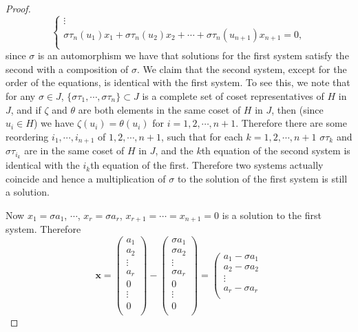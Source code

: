\begin{proof}
$$\begin{cases}
	\vdots\\
	\sigma \tau _n\left( u_1 \right) x_1+\sigma \tau _n\left( u_2 \right) x_2+\cdots +\sigma \tau _n\left( u_{n+1} \right) x_{n+1}=0,\\
\end{cases}
$$
since $\sigma$ is an automorphism we have that solutions for the first system satisfy the second with a composition of $\sigma$. We claim that the second system, except for the order of the equations, is identical with the first system. To see this, we note that for any $\sigma\in J$, $\{\sigma\tau_1,\cdots,\sigma\tau_n\}\subset J$ is a complete set of coset representatives of $H$ in $J$, and if $\zeta$ and $\theta$ are both elements in the same coset of $H$ in $J$, then (since $u_i\in H$) we have $\zeta(u_i)=\theta(u_i)$ for $i=1,2,\cdots,n+1$. Therefore there are some reordering $i_1,\cdots,i_{n+1}$ of $1,2,\cdots,n+1$, such that for each $k=1,2,\cdots,n+1$ $\sigma\tau_k$ and $\sigma\tau_{i_k}$ are in the same coset of $H$ in $J$, and the $k$th equation of the second system is identical with the $i_k$th equation of the first. Therefore two systems actually coincide and hence a multiplication of $\sigma$ to the solution of the first system is still a solution.\par
Now $x_1=\sigma a_1$, $\cdots$, $x_r=\sigma a_r$, $x_{r+1}=\cdots=x_{n+1}=0$ is a solution to the first system. Therefore 
$$
\mathbf{x}=\left( \begin{array}{c}
	a_1\\
	a_2\\
	\vdots\\
	a_r\\
	0\\
	\vdots\\
	0\\
\end{array} \right) -\left( \begin{array}{c}
	\sigma a_1\\
	\sigma a_2\\
	\vdots\\
	\sigma a_r\\
	0\\
	\vdots\\
	0\\
\end{array} \right) =\left( \begin{array}{c}
	a_1-\sigma a_1\\
	a_2-\sigma a_2\\
	\vdots\\
	a_r-\sigma a_r\\

\end{array}$$
\end{proof}
